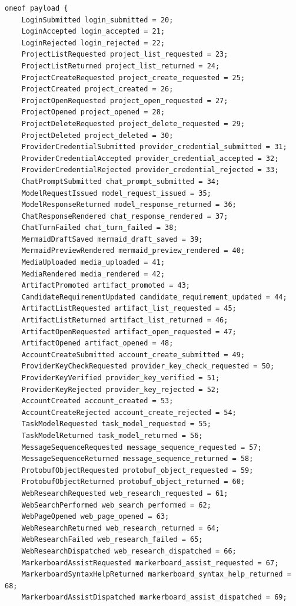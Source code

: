 \begin{lstlisting}[language={},basicstyle=\ttfamily\tiny,breaklines=true]
  oneof payload {
    LoginSubmitted login_submitted = 20;
    LoginAccepted login_accepted = 21;
    LoginRejected login_rejected = 22;
    ProjectListRequested project_list_requested = 23;
    ProjectListReturned project_list_returned = 24;
    ProjectCreateRequested project_create_requested = 25;
    ProjectCreated project_created = 26;
    ProjectOpenRequested project_open_requested = 27;
    ProjectOpened project_opened = 28;
    ProjectDeleteRequested project_delete_requested = 29;
    ProjectDeleted project_deleted = 30;
    ProviderCredentialSubmitted provider_credential_submitted = 31;
    ProviderCredentialAccepted provider_credential_accepted = 32;
    ProviderCredentialRejected provider_credential_rejected = 33;
    ChatPromptSubmitted chat_prompt_submitted = 34;
    ModelRequestIssued model_request_issued = 35;
    ModelResponseReturned model_response_returned = 36;
    ChatResponseRendered chat_response_rendered = 37;
    ChatTurnFailed chat_turn_failed = 38;
    MermaidDraftSaved mermaid_draft_saved = 39;
    MermaidPreviewRendered mermaid_preview_rendered = 40;
    MediaUploaded media_uploaded = 41;
    MediaRendered media_rendered = 42;
    ArtifactPromoted artifact_promoted = 43;
    CandidateRequirementUpdated candidate_requirement_updated = 44;
    ArtifactListRequested artifact_list_requested = 45;
    ArtifactListReturned artifact_list_returned = 46;
    ArtifactOpenRequested artifact_open_requested = 47;
    ArtifactOpened artifact_opened = 48;
    AccountCreateSubmitted account_create_submitted = 49;
    ProviderKeyCheckRequested provider_key_check_requested = 50;
    ProviderKeyVerified provider_key_verified = 51;
    ProviderKeyRejected provider_key_rejected = 52;
    AccountCreated account_created = 53;
    AccountCreateRejected account_create_rejected = 54;
    TaskModelRequested task_model_requested = 55;
    TaskModelReturned task_model_returned = 56;
    MessageSequenceRequested message_sequence_requested = 57;
    MessageSequenceReturned message_sequence_returned = 58;
    ProtobufObjectRequested protobuf_object_requested = 59;
    ProtobufObjectReturned protobuf_object_returned = 60;
    WebResearchRequested web_research_requested = 61;
    WebSearchPerformed web_search_performed = 62;
    WebPageOpened web_page_opened = 63;
    WebResearchReturned web_research_returned = 64;
    WebResearchFailed web_research_failed = 65;
    WebResearchDispatched web_research_dispatched = 66;
    MarkerboardAssistRequested markerboard_assist_requested = 67;
    MarkerboardSyntaxHelpReturned markerboard_syntax_help_returned = 68;
    MarkerboardAssistDispatched markerboard_assist_dispatched = 69;

\end{lstlisting}
